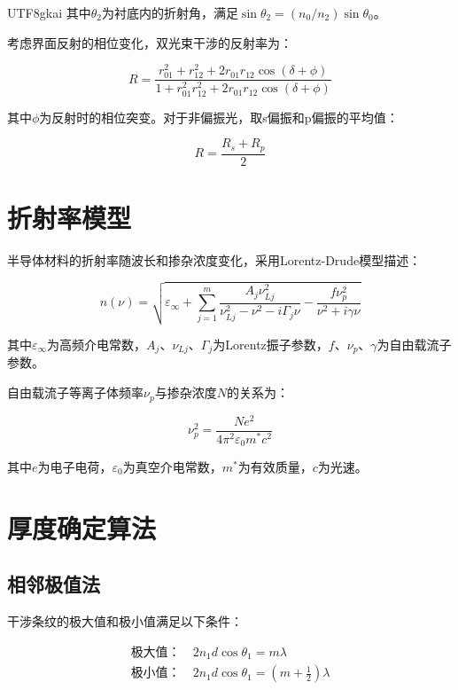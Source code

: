 \documentclass[12pt,a4paper]{article}
\begin{document}
\begin{CJK}{UTF8}{gkai}
其中$\theta_2$为衬底内的折射角，满足$\sin\theta_2 = (n_0/n_2)\sin\theta_0$。

考虑界面反射的相位变化，双光束干涉的反射率为：

\begin{equation}
R = \frac{r_{01}^2 + r_{12}^2 + 2r_{01}r_{12}\cos(\delta + \phi)}{1 + r_{01}^2r_{12}^2 + 2r_{01}r_{12}\cos(\delta + \phi)}
\end{equation}

其中$\phi$为反射时的相位突变。对于非偏振光，取s偏振和p偏振的平均值：

\begin{equation}
R = \frac{R_s + R_p}{2}
\end{equation}

\section{折射率模型}

半导体材料的折射率随波长和掺杂浓度变化，采用Lorentz-Drude模型描述：

\begin{equation}
n(\nu) = \sqrt{\varepsilon_\infty + \sum_{j=1}^{m}\frac{A_j\nu_{Lj}^2}{\nu_{Lj}^2 - \nu^2 - i\Gamma_j\nu} - \frac{f\nu_p^2}{\nu^2 + i\gamma\nu}}
\end{equation}

其中$\varepsilon_\infty$为高频介电常数，$A_j$、$\nu_{Lj}$、$\Gamma_j$为Lorentz振子参数，$f$、$\nu_p$、$\gamma$为自由载流子参数。

自由载流子等离子体频率$\nu_p$与掺杂浓度$N$的关系为：

\begin{equation}
\nu_p^2 = \frac{Ne^2}{4\pi^2\varepsilon_0m^*c^2}
\end{equation}

其中$e$为电子电荷，$\varepsilon_0$为真空介电常数，$m^*$为有效质量，$c$为光速。

\section{厚度确定算法}

\subsection{相邻极值法}

干涉条纹的极大值和极小值满足以下条件：

\begin{align}
\text{极大值：} \quad 2n_1d\cos\theta_1 = m\lambda \\
\text{极小值：} \quad 2n_1d\cos\theta_1 = \left(m + \frac{1}{2}\right)\lambda
\end{align}


\end{CJK}
\end{document}

